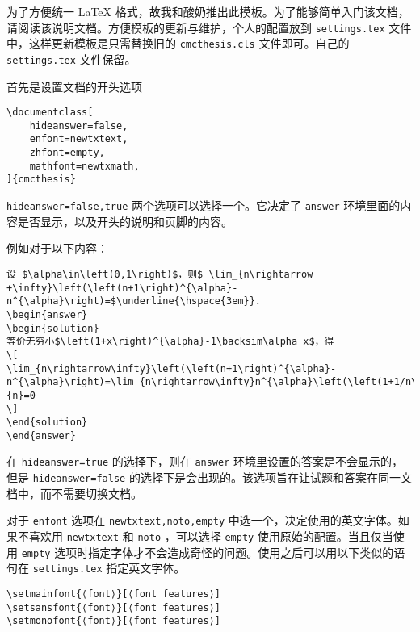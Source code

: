 \documentclass[hideanswer=false,
enfont=newtxtext,
zhfont=empty,
mathfont=newtxmath,
]{cmcthesis}
\begin{document}
	
\addvspace{1\bigskipamount}

为了方便统一 \LaTeX{} 格式，故我和酸奶推出此摸板。为了能够简单入门该文档，请阅读该说明文档。方便模板的更新与维护，个人的配置放到 \verb|settings.tex| 文件中，这样更新模板是只需替换旧的 \verb|cmcthesis.cls| 文件即可。自己的 \verb|settings.tex| 文件保留。

首先是设置文档的开头选项
\begin{lstlisting}[style=tex]
\documentclass[
	hideanswer=false,
	enfont=newtxtext,
	zhfont=empty,
	mathfont=newtxmath,
]{cmcthesis}
\end{lstlisting}
\verb|hideanswer=false,true| 两个选项可以选择一个。它决定了 \verb|answer| 环境里面的内容是否显示，以及开头的说明和页脚的内容。

例如对于以下内容：
\begin{lstlisting}[style=tex]
设 $\alpha\in\left(0,1\right)$，则$ \lim_{n\rightarrow +\infty}\left(\left(n+1\right)^{\alpha}-n^{\alpha}\right)=$\underline{\hspace{3em}}.
\begin{answer}
\begin{solution}
等价无穷小$\left(1+x\right)^{\alpha}-1\backsim\alpha x$，得
\[
\lim_{n\rightarrow\infty}\left(\left(n+1\right)^{\alpha}-n^{\alpha}\right)=\lim_{n\rightarrow\infty}n^{\alpha}\left(\left(1+1/n\right)^{\alpha}-1\right)=\lim_{n\rightarrow\infty}n^{\alpha}\times\frac{\alpha}{n}=0
\]
\end{solution}
\end{answer}
\end{lstlisting}
在 \verb|hideanswer=true| 的选择下，则在 \verb|answer| 环境里设置的答案是不会显示的，但是 \verb|hideanswer=false| 的选择下是会出现的。该选项旨在让试题和答案在同一文档中，而不需要切换文档。

对于 \verb|enfont| 选项在 \verb|newtxtext,noto,empty| 中选一个，决定使用的英文字体。如果不喜欢用 \verb|newtxtext| 和 \verb|noto| ，可以选择 \verb|empty| 使用原始的配置。当且仅当使用 \verb|empty| 选项时指定字体才不会造成奇怪的问题。使用之后可以用以下类似的语句在 \verb|settings.tex| 指定英文字体。
\begin{lstlisting}[style=tex]
\setmainfont{⟨font⟩}[⟨font features⟩]
\setsansfont{⟨font⟩}[⟨font features⟩]
\setmonofont{⟨font⟩}[⟨font features⟩]
\end{lstlisting}
\end{document}
